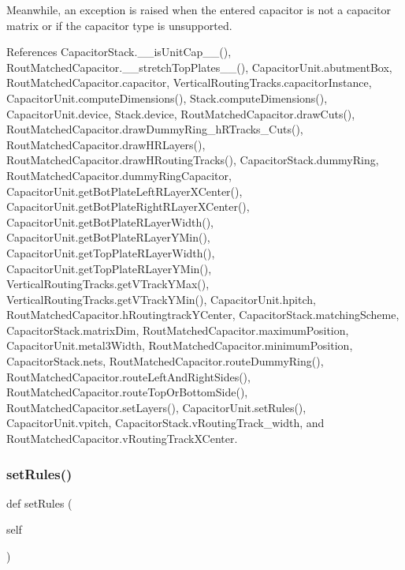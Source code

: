 Meanwhile, an exception is raised when the entered {\ttfamily capacitor} is not a capacitor matrix or if the capacitor type is unsupported. 

References Capacitor\+Stack.\+\_\+\+\_\+is\+Unit\+Cap\+\_\+\+\_\+(), Rout\+Matched\+Capacitor.\+\_\+\+\_\+stretch\+Top\+Plates\+\_\+\+\_\+(), Capacitor\+Unit.\+abutment\+Box, Rout\+Matched\+Capacitor.\+capacitor, Vertical\+Routing\+Tracks.\+capacitor\+Instance, Capacitor\+Unit.\+compute\+Dimensions(), Stack.\+compute\+Dimensions(), Capacitor\+Unit.\+device, Stack.\+device, Rout\+Matched\+Capacitor.\+draw\+Cuts(), Rout\+Matched\+Capacitor.\+draw\+Dummy\+Ring\+\_\+h\+R\+Tracks\+\_\+\+Cuts(), Rout\+Matched\+Capacitor.\+draw\+H\+R\+Layers(), Rout\+Matched\+Capacitor.\+draw\+H\+Routing\+Tracks(), Capacitor\+Stack.\+dummy\+Ring, Rout\+Matched\+Capacitor.\+dummy\+Ring\+Capacitor, Capacitor\+Unit.\+get\+Bot\+Plate\+Left\+R\+Layer\+X\+Center(), Capacitor\+Unit.\+get\+Bot\+Plate\+Right\+R\+Layer\+X\+Center(), Capacitor\+Unit.\+get\+Bot\+Plate\+R\+Layer\+Width(), Capacitor\+Unit.\+get\+Bot\+Plate\+R\+Layer\+Y\+Min(), Capacitor\+Unit.\+get\+Top\+Plate\+R\+Layer\+Width(), Capacitor\+Unit.\+get\+Top\+Plate\+R\+Layer\+Y\+Min(), Vertical\+Routing\+Tracks.\+get\+V\+Track\+Y\+Max(), Vertical\+Routing\+Tracks.\+get\+V\+Track\+Y\+Min(), Capacitor\+Unit.\+hpitch, Rout\+Matched\+Capacitor.\+h\+Routingtrack\+Y\+Center, Capacitor\+Stack.\+matching\+Scheme, Capacitor\+Stack.\+matrix\+Dim, Rout\+Matched\+Capacitor.\+maximum\+Position, Capacitor\+Unit.\+metal3\+Width, Rout\+Matched\+Capacitor.\+minimum\+Position, Capacitor\+Stack.\+nets, Rout\+Matched\+Capacitor.\+route\+Dummy\+Ring(), Rout\+Matched\+Capacitor.\+route\+Left\+And\+Right\+Sides(), Rout\+Matched\+Capacitor.\+route\+Top\+Or\+Bottom\+Side(), Rout\+Matched\+Capacitor.\+set\+Layers(), Capacitor\+Unit.\+set\+Rules(), Capacitor\+Unit.\+vpitch, Capacitor\+Stack.\+v\+Routing\+Track\+\_\+width, and Rout\+Matched\+Capacitor.\+v\+Routing\+Track\+X\+Center.

\mbox{\label{classpython_1_1capacitorrouted_1_1RoutMatchedCapacitor_a458149b1404a0e797668330beb75b640}} 
\subsubsection{\texorpdfstring{set\+Rules()}{setRules()}}
{\footnotesize\ttfamily def set\+Rules (\begin{DoxyParamCaption}\item[{}]{self }\end{DoxyParamCaption})}



